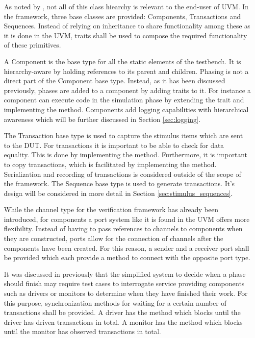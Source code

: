 As noted by \citeauthor{sutherland2015uvm} \cite{sutherland2015uvm}, not all of this class hiearchy is relevant to
the end-user of UVM. In the framework, three base classes are provided: Components, Transactions and Sequences.
Instead of relying on inheritance to share functionality among these as it is done in the UVM, traits shall be used
to compose the required functionality of these primitives.

A Component is the base type for all the static elements of the testbench. It is hierarchy-aware by holding
references to its parent and children. Phasing is not a direct part of the Component base type. Instead, as it has
been discussed previously, phases are added to a component by adding traits to it. For instance a component can
execute code in the simulation phase by extending the  trait and implementing the 
method. Components add logging capabilities with hierarchical awareness which will be further discussed in Section
\ref{sec:logging}.

The Transaction base type is used to capture the stimulus items which are sent to the DUT. For transactions it is
important to be able to check for data equality. This is done by implementing the  method.
Furthermore, it is important to copy transactions, which is facilitated by implementing the  method.
Serialization and recording of transactions is considered outside of the scope of the framework. The Sequence base
type is used to generate transactions. It's design will be considered in more detail in Section \ref{sec:stimulus_sequences}.

While the channel type for the verification framework has already been introduced, for components a port system like it is found in the UVM offers more flexibility. Instead of having to pass references to channels to components when they are constructed, ports allow for the connection of channels after the components have been created. For this reason, a sender and a receiver port shall be provided which each provide a  method to connect with the opposite port type. 

It was discussed in previously that the simplified system to decide when a phase should finish may require test cases to interrogate service providing components such as drivers or monitors to determine when they have finished their work. For this purpose, synchronization methods for waiting for a certain number of transactions shall be provided. A driver has the  method which blocks until the driver has driven  transactions in total. A monitor has the  method which blocks until the monitor has observed  transactions in total.

